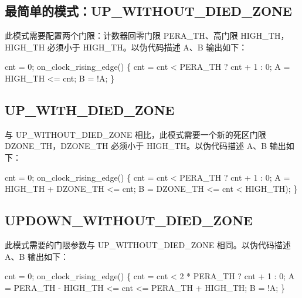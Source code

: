 \documentclass[
  12pt,
]{book}
\newenvironment{Shaded}{\begin{snugshade}}{\end{snugshade}}
\newcommand{\DecValTok}[1]{\textcolor[rgb]{0.00,0.00,0.81}{#1}}
\newcommand{\NormalTok}[1]{#1}
\begin{document}
\hypertarget{ux6700ux7b80ux5355ux7684ux6a21ux5f0fup_without_died_zone}{%
\subsection{最简单的模式：UP\_WITHOUT\_DIED\_ZONE}\label{ux6700ux7b80ux5355ux7684ux6a21ux5f0fup_without_died_zone}}

此模式需要配置两个门限：计数器回零门限 PERA\_TH、高门限 HIGH\_TH，HIGH\_TH
必须小于 HIGH\_TH。以伪代码描述 A、B 输出如下：

\begin{Shaded}
\begin{Highlighting}[]
\NormalTok{cnt = }\DecValTok{0}\NormalTok{;}
\NormalTok{on_clock_rising_edge()}
\NormalTok{\{}
\NormalTok{    cnt = cnt < PERA_TH ? cnt + }\DecValTok{1}\NormalTok{ : }\DecValTok{0}\NormalTok{;}
\NormalTok{    A = HIGH_TH <= cnt;}
\NormalTok{    B = !A;}
\NormalTok{\}}
\end{Highlighting}
\end{Shaded}

\hypertarget{up_with_died_zone}{%
\subsection{UP\_WITH\_DIED\_ZONE}\label{up_with_died_zone}}

与 UP\_WITHOUT\_DIED\_ZONE 相比，此模式需要一个新的死区门限 DZONE\_TH，DZONE\_TH
必须小于 HIGH\_TH。以伪代码描述 A、B 输出如下：

cnt = 0;
on\_clock\_rising\_edge()
\{
cnt = cnt \textless{} PERA\_TH ? cnt + 1 : 0;
A = HIGH\_TH + DZONE\_TH \textless= cnt;
B = DZONE\_TH \textless= cnt \textless{} HIGH\_TH);
\}

\hypertarget{updown_without_died_zone}{%
\subsection{UPDOWN\_WITHOUT\_DIED\_ZONE}\label{updown_without_died_zone}}

此模式需要的门限参数与 UP\_WITHOUT\_DIED\_ZONE 相同。以伪代码描述 A、B 输出如下：

\begin{Shaded}
\begin{Highlighting}[]
\NormalTok{cnt = }\DecValTok{0}\NormalTok{;}
\NormalTok{on_clock_rising_edge()}
\NormalTok{\{}
\NormalTok{    cnt = cnt < }\DecValTok{2}\NormalTok{ * PERA_TH ? cnt + }\DecValTok{1}\NormalTok{ : }\DecValTok{0}\NormalTok{;}
\NormalTok{    A = PERA_TH - HIGH_TH <= cnt <= PERA_TH + HIGH_TH;}
\NormalTok{    B = !A;}
\NormalTok{\}}
\end{Highlighting}
\end{Shaded}
\end{document}
